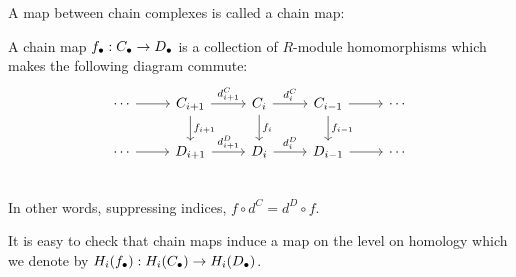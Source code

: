 A map between chain complexes is called a chain map:

\begin{definition}
    A chain map $f_\bullet: C_\bullet \to  D_\bullet$ is a collection of $R$-module homomorphisms which makes the following diagram commute:
    \[
        \begin{tikzcd}
            \cdots  \arrow[r, ""]&
            C_{i+1} \arrow[r, "d_{i+1}^{C}"] \arrow[d, "f_{i+1}"]&
            C_{i} \arrow[r, "d_{i}^{C}"] \arrow[d, "f_i"]&
            C_{i-1} \arrow[r, ""] \arrow[d, "f_{i-1}"]&
            \cdots \\
            \cdots  \arrow[r, ""]&
            D_{i+1} \arrow[r, "d_{i+1}^{D}"] &
            D_{i} \arrow[r, "d_{i}^{D}"] &
            D_{i-1} \arrow[r, ""] &
            \cdots \\
        \end{tikzcd}
    \]
    In other words, suppressing indices, $f  \circ  d^{C} = d^{D}  \circ f$.
\end{definition}

It is easy to check that chain maps induce a map on the level on homology which we denote by $H_i(f_\bullet): H_i(C_\bullet) \to  H_i(D_\bullet)$.

